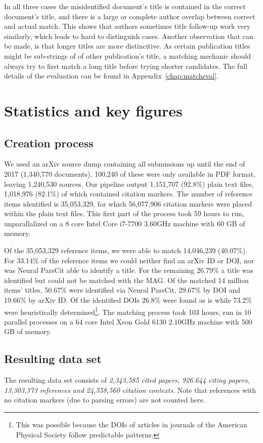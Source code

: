 In all three cases the misidentified document’s title is contained in the correct document’s title, and there is a large or complete author overlap between correct and actual match. This shows that authors sometimes title follow-up work very similarly, which leads to hard to distinguish cases. Another observation that can be made, is that longer titles are more distincitive. As certain publication titles might be sub-strings of of other publication's title, a matching mechanic should always try to first match a long title before trying shorter candidates. The full details of the evaluation can be found in Appendix~\ref{chap:matcheval}.

\section{Statistics and key figures}

\subsection{Creation process}
We used an arXiv source dump containing all submissions up until the end of 2017 (1,340,770 documents). 100,240 of these were only available in PDF format, leaving 1,240,530 sources. Our pipeline output 1,151,707 (92.8\%) plain text files, 1,018,976 (82.1\%) of which contained citation markers. The number of reference items identified is 35,053,329, for which 56,077,906 citation markers were placed within the plain text files. This first part of the process took 59 hours to run, unparallalized on a 8 core Intel Core i7-7700 3.60GHz machine with 60 GB of memory.

Of the 35,053,329 reference items, we were able to match 14,046,239 (40.07\%). For 33.14\% of the reference items we could neither find an arXiv ID or DOI, nor was Neural ParsCit able to identify a title. For the remaining 26.79\% a title was identified but could not be matched with the MAG. Of the matched 14 million items' titles, 50.67\% were identified via Neural ParsCit, 29.67\% by DOI and 19.66\% by arXiv ID. Of the identified DOIs 26.8\% were found as is while 73.2\% were heuristically determined\footnote{This was possible because the DOIs of articles in journals of the American Physical Society follow predictable patterns.}. The matching process took 103 hours, run in 10 parallel processes on a 64 core Intel Xeon Gold 6130 2.10GHz machine with 500 GB of memory.

\subsection{Resulting data set}
The resulting data set consists of \emph{2,343,585 cited papers, 926.644 citing papers, 13,303,373 references and 24,558,560 citation contexts}. Note that references with no citation markers (due to parsing errors) are not counted here.

